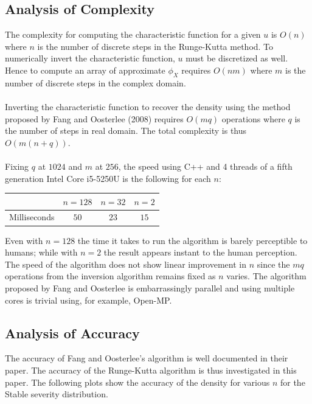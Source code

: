 \documentclass{article}
\theoremstyle{definition}
\begin{document}
\subsection{Analysis of Complexity}
The complexity for computing the characteristic function for a given \(u\) is \(O(n)\) where \(n\) is the number of discrete steps in the Runge-Kutta method.  To numerically invert the characteristic function, \(u\) must be discretized as well.  Hence to compute an array of approximate \(\phi_X\) requires \(O(nm)\) where \(m\) is the number of discrete steps in the complex domain.  
\\
\\
Inverting the characteristic function to recover the density using the method proposed by Fang and Oosterlee (2008) requires \(O(mq)\) operations where \(q\) is the number of steps in real domain.  The total complexity is thus \(O(m(n+q))\).  
\\
\\
Fixing \(q\) at \(1024\) and \(m\) at \(256\), the speed using C++ and 4 threads of a fifth generation Intel Core i5-5250U is the following for each \(n\):

\begin{center}
\begin{tabular}{c|c|c|c}
& \(n=128\) & \(n=32\) & \(n=2\)\\
\hline
Milliseconds & \(50\) & \(23\) & \(15\)
\end{tabular}
\end{center}

Even with \(n=128\) the time it takes to run the algorithm is barely perceptible to humans; while with \(n=2\) the result appears instant to the human perception. The speed of the algorithm does not show linear improvement in \(n\) since the \(mq\) operations from the inversion algorithm remains fixed as \(n\) varies. The algorithm proposed by Fang and Oosterlee is embarrassingly parallel and using multiple cores is trivial using, for example, Open-MP.

\subsection{Analysis of Accuracy}

The accuracy of Fang and Oosterlee's algorithm is well documented in their paper.  The accuracy of the Runge-Kutta algorithm is thus investigated in this paper.  The following plots show the accuracy of the density for various \(n\) for the Stable severity distribution.
\end{document}
